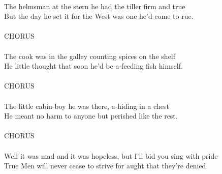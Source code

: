 \begin{multicols}{2}
\\
The helmsman at the stern he had the tiller firm and true
\\
But the day he set it for the West was one he’d come to rue.
\\
\\CHORUS
\\
\\
The cook was in the galley counting spices on the shelf
\\
He little thought that soon he’d be a-feeding fish himself.
\\
\\CHORUS
\\
\\
The little cabin-boy he was there, a-hiding in a chest
\\
He meant no harm to anyone but perished like the rest.
\\
\\CHORUS
\\
\\
Well it was mad and it was hopeless, but I’ll bid you sing with pride
\\
True Men will never cease to strive for aught that they’re denied.
\end{multicols}